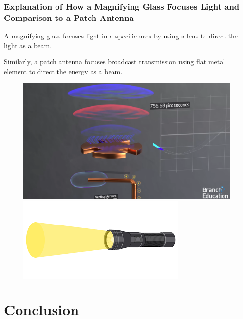 \documentclass{beamer}
\begin{document}
\begin{frame}
\frametitle{Explanation of How a Magnifying Glass Focuses Light and Comparison to a Patch Antenna}

A magnifying glass focuses light in a specific area by using a lens to direct the light as a beam.


Similarly, a patch antenna focuses broadcast transmission using flat metal element to direct the energy as a beam.

        \begin{figure}[htbp]
        \begin{minipage}[b]{0.5\linewidth}
            \centering
            \includegraphics[width=0.8\linewidth]{patch2.png}
            \end{minipage}%
            \begin{minipage}[b]{0.5\linewidth}
            \centering
            \includegraphics[width=0.8\linewidth]{flashlight.png}
        \end{minipage}
        \end{figure}
\end{frame}

\section{Conclusion}
\end{document}

